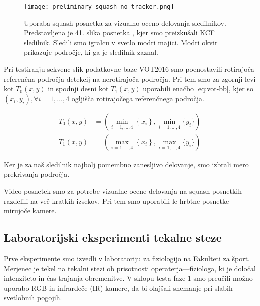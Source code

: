 \begin{figure}[htbp]
	\centering
	\texttt{[image: preliminary-squash-no-tracker.png]}
	\caption[Uporaba squash posnetka za vizualno oceno delovanja sledilnikov]{Uporaba squash posnetka za vizualno oceno delovanja sledilnikov. Predstavljena je 41. slika posnetka \cite{squashtv2014squash}, kjer smo preizkušali KCF sledilnik. Sledili smo igralcu v svetlo modri majici. Modri okvir prikazuje področje, ki ga je sledilnik zaznal.}
	\label{fig:testiranje-squash-1-kcf}
\end{figure}



Pri testiranju sekvenc slik podatkovne baze VOT2016 smo poenostavili rotirajoča referenčna področja detekcij na nerotirajoča področja. Pri tem smo za zgornji levi kot $T_0(x,y)$ in spodnji desni kot $T_1(x,y)$ uporabili enačbo \eqref{eq:vot-bb}, kjer so $\left( x_i, y_i\right), \forall i=1,\ldots,4$ ogljišča rotirajočega referenčnega področja. 

\begin{equation}
\begin{aligned}
T_0(x,y) &= \left( \min_{i = 1,\ldots,4}\left\{x_i \right\}, 
\min_{i=1,\ldots,4}\{y_i \} \right) \\
T_1(x,y) &= \left( \max_{i = 1,\ldots,4}\left\{x_i \right\}, 
\max_{i=1,\ldots,4}\{y_i \} \right)
\end{aligned}
\label{eq:vot-bb}
\end{equation}

Ker je za naš sledilnik najbolj pomembno zanesljivo delovanje, smo izbrali mero prekrivanja področja.


Video posnetek \cite{squashtv2014squash} smo za potrebe vizualne ocene delovanja na squash posnetkih razdelili na več kratkih izsekov. Pri tem smo uporabili le hrbtne posnetke mirujoče kamere. 







\subsection{Laboratorijski eksperimenti tekalne steze}
Prve eksperimente smo izvedli v laboratoriju za fiziologijo na Fakulteti za šport. Merjenec je tekel na tekalni stezi ob prisotnosti operaterja---fiziologa, ki je določal intenziteto in čas trajanja obremenitve. V sklopu testa faze 1 smo preučili možno uporabo RGB in infrardeče (IR) kamere, da bi olajšali snemanje pri slabih svetlobnih pogojih.


